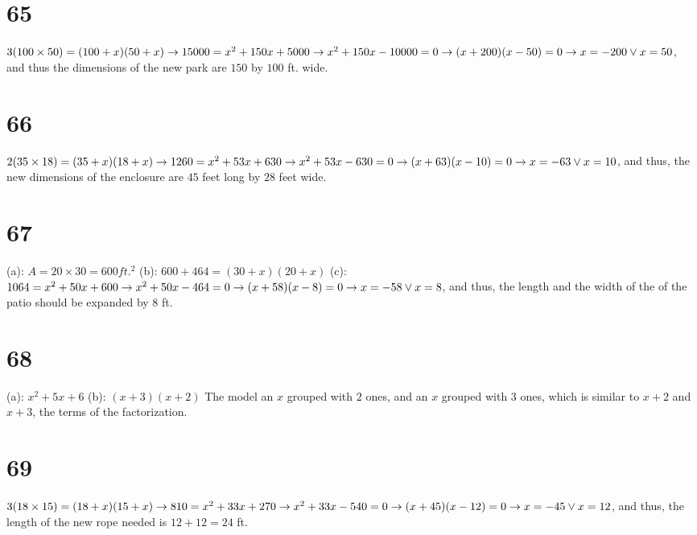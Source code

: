 \documentclass{article}
\theoremstyle{definition}
\begin{document}
\section*{65}
$3(100\times 50)=(100+x)(50+x)\newline\rightarrow 15000=x^2+150x+5000\newline\rightarrow x^2+150x-10000=0\newline\rightarrow (x+200)(x-50)=0\newline
\rightarrow x=-200\vee x=50$, and thus the dimensions of the new park are $150$ by $100$ ft. wide. 

\section*{66}
$2(35\times 18)=(35+x)(18+x)\newline\rightarrow 1260=x^2+53x+630\newline\rightarrow x^2+53x-630=0\newline\rightarrow (x+63)(x-10)=0\newline\rightarrow 
x=-63\vee x=10$, and thus, the new dimensions of the enclosure are $45$ feet long by $28$ feet wide.

\section*{67}
(a): $A=20\times 30=600 ft.^2$\newline
(b): $600+464=(30+x)(20+x)$\newline
(c): $1064=x^2+50x+600\newline\rightarrow x^2+50x-464=0\newline\rightarrow (x+58)(x-8)=0\newline\rightarrow x=-58\vee x=8$, and thus, the length and the 
width of the of the patio should be expanded by $8$ ft. 

\section*{68}
(a): $x^2+5x+6$\newline
(b): $(x+3)(x+2)$ The model an $x$ grouped with $2$ ones, and an $x$ grouped with $3$ ones, which is similar to $x+2$ and $x+3$, the terms of the 
factorization.

\section*{69}
$3(18\times 15)=(18+x)(15+x)\newline\rightarrow 810=x^2+33x+270\newline\rightarrow x^2+33x-540=0\newline\rightarrow (x+45)(x-12)=0\newline\rightarrow 
x=-45\vee x=12$, and thus, the length of the new rope needed is $12+12=24$ ft.
\end{document}
